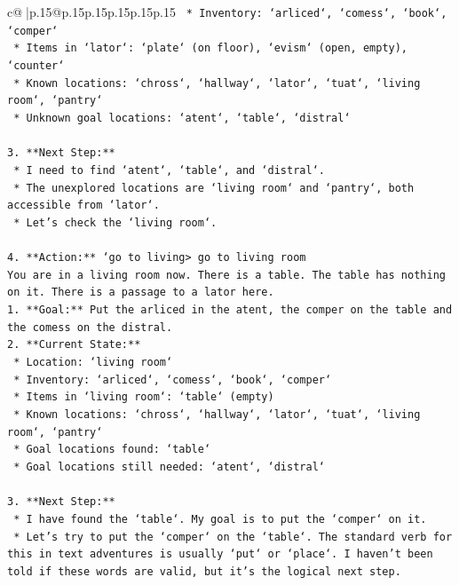 \documentclass{article}
\begin{document}
{\begin{supertabular}{c@{$\;$}|p{.15\linewidth}@{}p{.15\linewidth}p{.15\linewidth}p{.15\linewidth}p{.15\linewidth}p{.15\linewidth}}
{{{\texttt{    *   Inventory: `arliced`, `comess`, `book`, `comper`} \\
\texttt{    *   Items in `lator`: `plate` (on floor), `evism` (open, empty), `counter`} \\
\texttt{    *   Known locations: `chross`, `hallway`, `lator`, `tuat`, `living room`, `pantry`} \\
\texttt{    *   Unknown goal locations: `atent`, `table`, `distral`} \\
\\ 
\texttt{3.  **Next Step:**} \\
\texttt{    *   I need to find `atent`, `table`, and `distral`.} \\
\texttt{    *   The unexplored locations are `living room` and `pantry`, both accessible from `lator`.} \\
\texttt{    *   Let's check the `living room`.} \\
\\ 
\texttt{4.  **Action:** `go to living> go to living room} \\
\texttt{You are in a living room now. There is a table. The table has nothing on it. There is a passage to a lator here.} \\
\texttt{1.  **Goal:** Put the arliced in the atent, the comper on the table and the comess on the distral.} \\
\texttt{2.  **Current State:**} \\
\texttt{    *   Location: `living room`} \\
\texttt{    *   Inventory: `arliced`, `comess`, `book`, `comper`} \\
\texttt{    *   Items in `living room`: `table` (empty)} \\
\texttt{    *   Known locations: `chross`, `hallway`, `lator`, `tuat`, `living room`, `pantry`} \\
\texttt{    *   Goal locations found: `table`} \\
\texttt{    *   Goal locations still needed: `atent`, `distral`} \\
\\ 
\texttt{3.  **Next Step:**} \\
\texttt{    *   I have found the `table`. My goal is to put the `comper` on it.} \\
\texttt{    *   Let's try to put the `comper` on the `table`. The standard verb for this in text adventures is usually `put` or `place`. I haven't been told if these words are valid, but it's the logical next step.} \\
}}}
\end{supertabular}}
\end{document}
